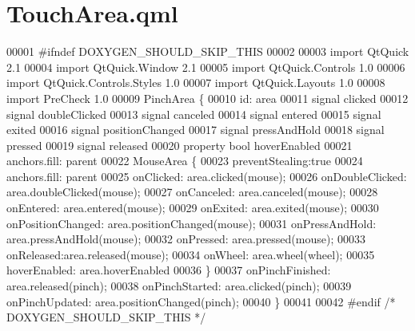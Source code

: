 \hypertarget{TouchArea_8qml}{\section{Touch\-Area.\-qml}
\label{TouchArea_8qml}
}

\begin{DoxyCode}
00001 \textcolor{preprocessor}{#ifndef DOXYGEN\_SHOULD\_SKIP\_THIS}
00002 \textcolor{preprocessor}{}
00003 \textcolor{keyword}{import} QtQuick 2.1
00004 import QtQuick.Window 2.1
00005 import QtQuick.Controls 1.0
00006 import QtQuick.Controls.Styles 1.0
00007 import QtQuick.Layouts 1.0
00008 import PreCheck 1.0
00009 PinchArea \{
00010     \textcolor{keywordtype}{id}: area
00011     signal clicked
00012     signal doubleClicked
00013     signal canceled
00014     signal entered
00015     signal exited
00016     signal positionChanged
00017     signal pressAndHold
00018     signal pressed
00019     signal released
00020     \textcolor{keyword}{property} \textcolor{keywordtype}{bool} hoverEnabled
00021     anchors.fill: parent
00022     MouseArea \{
00023         preventStealing:\textcolor{keyword}{true}
00024         anchors.fill: parent
00025         onClicked: area.clicked(mouse);
00026         onDoubleClicked: area.doubleClicked(mouse);
00027         onCanceled: area.canceled(mouse);
00028         onEntered: area.entered(mouse);
00029         onExited: area.exited(mouse);
00030         onPositionChanged: area.positionChanged(mouse);
00031         onPressAndHold: area.pressAndHold(mouse);
00032         onPressed: area.pressed(mouse);
00033         onReleased:area.released(mouse);
00034         onWheel: area.wheel(wheel);
00035         hoverEnabled: area.hoverEnabled
00036     \}
00037     onPinchFinished: area.released(pinch);
00038     onPinchStarted: area.clicked(pinch);
00039     onPinchUpdated: area.positionChanged(pinch);
00040 \}
00041 
00042 \textcolor{preprocessor}{#endif }\textcolor{comment}{/* DOXYGEN\_SHOULD\_SKIP\_THIS */}\textcolor{preprocessor}{}
\end{DoxyCode}
